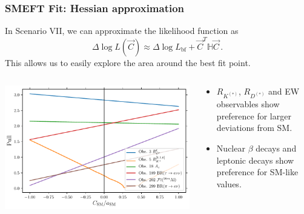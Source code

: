 \documentclass[mathserif, 10pt]{beamer}
\begin{document}
\begin{frame}\frametitle{SMEFT Fit: Hessian approximation}

    In Scenario VII, we can approximate the likelihood function as
    $$\Delta\log L (\vec{C}) \approx \Delta\log L_\mathrm{bf} + \vec{C}^T \mathbb{H} \vec{C}\,.$$
    This allows us to easily explore the area around the best fit point.

\vspace{0.5cm}

\begin{columns}
    \begin{column}{0.52\textwidth}
        \includegraphics[width=\textwidth]{figures/evo_sm.pdf}
    \end{column}
    \begin{column}{0.45\textwidth}
        \begin{itemize}
            \item $R_{K^{(*)}}$, $R_{D^{(*)}}$ and EW observables show preference for larger deviations from SM.
            \item Nuclear $\beta$ decays and leptonic decays show preference for SM-like values.
        \end{itemize}
    \end{column}
\end{columns}

\end{frame}
\end{document}
